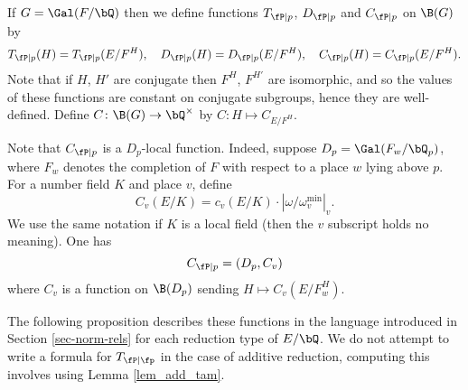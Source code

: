 \begin{defn}\label{not_contr_fns}
    If $G = \Gal(F / \bQ)$ then we define functions $T_{\fP \mid p}$, $D_{\fP \mid p}$ and $C_{\fP \mid p}$ on $\B(G)$ by 
    \[ T_{\fP \mid p}(H) = T_{\fP \mid p}(E / F^H), \quad D_{\fP \mid p}(H) = D_{\fP \mid p}(E / F^H), \quad C_{\fP \mid p}(H) = C_{\fP \mid p}(E / F^H). \]
    Note that if $H$, $H'$ are conjugate then $F^H$, $F^{H'}$ are isomorphic, and so the values of these functions are constant on conjugate subgroups, hence they are well-defined. Define $C \colon \B(G) \to \bQ^{\times}$ by $C \colon H \mapsto C_{E / F^H}$.  
\end{defn}
    
    Note that $C_{\fP \mid p}$ is a $D_p$-local function. Indeed, suppose $D_p = \Gal(F_w / \bQ_p)$, where $F_w$ denotes the completion of $F$ with respect to a place $w$ lying above $p$. For a number field $K$ and place $v$, define $$C_v(E / K) = c_v(E / K) \cdot \left| \omega / \omega_v^{\min} \right|_v.$$ We use the same notation if $K$ is a local field (then the $v$ subscript holds no meaning).
    One has
    \begin{equation*}
    C_{\fP \mid p} = (D_p, C_v)
    \end{equation*}
    where $C_v$ is a function on $\B(D_p)$ sending $H \mapsto C_v(E / F_w^H)$.

 The following proposition describes these functions in the language introduced in Section \ref{sec-norm-rels} for each reduction type of $E / \bQ$. We do not attempt to write a formula for $T_{\fP \mid \fp}$ in the case of additive reduction, computing this involves using Lemma \ref{lem_add_tam}.

